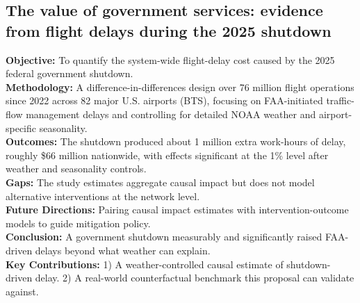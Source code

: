 \documentclass[twocolumn]{article}
\begin{document}
\subsection{The value of government services: evidence from flight delays during the 2025 shutdown \cite{richmondfed2025}}
\textbf{Objective:} To quantify the system-wide flight-delay cost caused by the 2025 federal government shutdown. \\
\textbf{Methodology:} A difference-in-differences design over 76 million flight operations since 2022 across 82 major U.S. airports (BTS), focusing on FAA-initiated traffic-flow management delays and controlling for detailed NOAA weather and airport-specific seasonality. \\
\textbf{Outcomes:} The shutdown produced about 1 million extra work-hours of delay, roughly \$66 million nationwide, with effects significant at the 1\% level after weather and seasonality controls. \\
\textbf{Gaps:} The study estimates aggregate causal impact but does not model alternative interventions at the network level. \\
\textbf{Future Directions:} Pairing causal impact estimates with intervention-outcome models to guide mitigation policy. \\
\textbf{Conclusion:} A government shutdown measurably and significantly raised FAA-driven delays beyond what weather can explain. \\
\textbf{Key Contributions:} 1) A weather-controlled causal estimate of shutdown-driven delay. 2) A real-world counterfactual benchmark this proposal can validate against.



\end{document}
